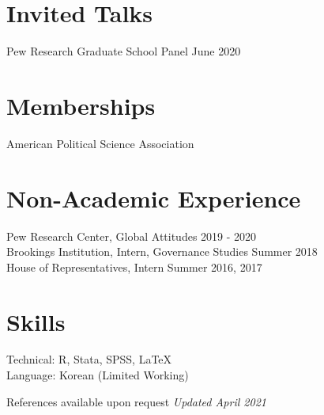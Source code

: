 \documentclass[margin, line]{res}
\begin{document}
\begin{resume}
\section{Invited Talks}
Pew Research Graduate School Panel \hfill June 2020

\section{Memberships}
American Political Science Association

\section{Non-Academic Experience}
Pew Research Center, Global Attitudes \hfill 2019 - 2020\\
Brookings Institution, Intern, Governance Studies \hfill Summer 2018\\
House of Representatives, Intern \hfill Summer 2016, 2017

\section{Skills}
Technical: R, Stata, SPSS, \LaTeX\\
Language: Korean (Limited Working)

\small{References available upon request} \hfill \small{\textit{Updated April 2021}}

\end{resume}
\end{document}
